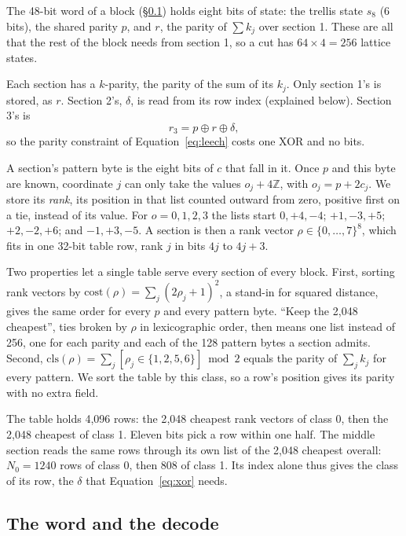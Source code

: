 The 48-bit word of a block (\S\ref{sec:decode}) holds eight bits of state: the
trellis state $s_8$ (6 bits), the shared parity $p$, and $r$, the parity of
$\sum k_j$ over section 1. These are all that the rest of the block needs from
section 1, so a cut has $64\times4 = 256$ lattice states.

Each section has a $k$-parity, the parity of the sum of its $k_j$. Only
section 1's is stored, as $r$. Section 2's, $\delta$, is read from its row
index (explained below). Section 3's is
\begin{equation}
r_3 = p \oplus r \oplus \delta ,
\label{eq:xor}
\end{equation}
so the parity constraint of Equation~\eqref{eq:leech} costs one XOR and no bits.

A section's pattern byte is the eight bits of $c$ that fall in it. Once $p$
and this byte are known, coordinate $j$ can only take the values
$o_j + 4\mathbb{Z}$, with $o_j = p + 2c_j$. We store its \emph{rank}, its
position in that list counted outward from zero, positive first on a tie,
instead of its value. For $o = 0, 1, 2, 3$ the lists start $0, +4, -4$;
$+1, -3, +5$; $+2, -2, +6$; and $-1, +3, -5$. A section is then a rank vector
$\rho \in \{0,\dots,7\}^8$, which fits in one 32-bit table row, rank $j$ in
bits $4j$ to $4j+3$.

Two properties let a single table serve every section of every block. First,
sorting rank vectors by $\mathrm{cost}(\rho)=\sum_j(2\rho_j+1)^2$, a stand-in
for squared distance, gives the same order for every $p$ and every pattern
byte. ``Keep the 2{,}048 cheapest'', ties broken by $\rho$ in lexicographic
order, then means one list instead of 256, one
for each parity and each of the 128 pattern bytes a section admits. Second,
$\mathrm{cls}(\rho)=\sum_j[\rho_j\in\{1,2,5,6\}] \bmod 2$ equals the parity
of $\sum_j k_j$ for every pattern. We sort the table by this class, so a row's
position gives its parity with no extra field.

The table holds 4{,}096 rows: the 2{,}048 cheapest rank vectors of class 0,
then the 2{,}048 cheapest of class 1. Eleven bits pick a row within one half.
The middle section reads the same rows through its own list of the 2{,}048
cheapest overall: $N_0 = 1240$ rows of class 0, then 808 of class 1. Its index
alone thus gives the class of its row, the $\delta$ that
Equation~\eqref{eq:xor} needs.

\subsection{The word and the decode}
\label{sec:decode}

